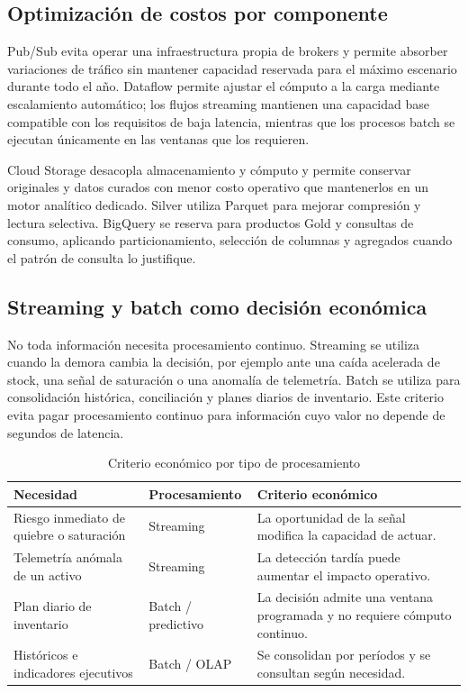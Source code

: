 \documentclass[11pt,a4paper]{article}
\begin{document}
\subsection*{Optimización de costos por componente}
Pub/Sub evita operar una infraestructura propia de brokers y permite absorber variaciones de tráfico sin mantener capacidad reservada para el máximo escenario durante todo el año. Dataflow permite ajustar el cómputo a la carga mediante escalamiento automático; los flujos streaming mantienen una capacidad base compatible con los requisitos de baja latencia, mientras que los procesos batch se ejecutan únicamente en las ventanas que los requieren.

Cloud Storage desacopla almacenamiento y cómputo y permite conservar originales y datos curados con menor costo operativo que mantenerlos en un motor analítico dedicado. Silver utiliza Parquet para mejorar compresión y lectura selectiva. BigQuery se reserva para productos Gold y consultas de consumo, aplicando particionamiento, selección de columnas y agregados cuando el patrón de consulta lo justifique.

\subsection*{Streaming y batch como decisión económica}
No toda información necesita procesamiento continuo. Streaming se utiliza cuando la demora cambia la decisión, por ejemplo ante una caída acelerada de stock, una señal de saturación o una anomalía de telemetría. Batch se utiliza para consolidación histórica, conciliación y planes diarios de inventario. Este criterio evita pagar procesamiento continuo para información cuyo valor no depende de segundos de latencia.

\begin{table}[H]
\caption{Criterio económico por tipo de procesamiento}\label{tab:costos-procesamiento}
\small\begin{tabularx}{\linewidth}{@{}P{.28\linewidth}YY@{}}\toprule
Necesidad & Procesamiento & Criterio económico\\\midrule
Riesgo inmediato de quiebre o saturación & Streaming & La oportunidad de la señal modifica la capacidad de actuar.\\
Telemetría anómala de un activo & Streaming & La detección tardía puede aumentar el impacto operativo.\\
Plan diario de inventario & Batch / predictivo & La decisión admite una ventana programada y no requiere cómputo continuo.\\
Históricos e indicadores ejecutivos & Batch / OLAP & Se consolidan por períodos y se consultan según necesidad.\\\bottomrule
\end{tabularx}
\end{table}
\end{document}
